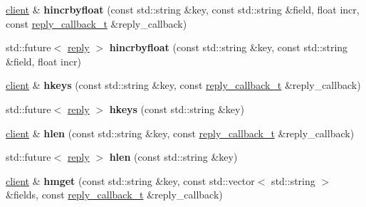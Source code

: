 \begin{DoxyCompactItemize}
\mbox{\hyperlink{classcpp__redis_1_1client}{client}} \& {\bfseries hincrbyfloat} (const std\+::string \&key, const std\+::string \&field, float incr, const \mbox{\hyperlink{classcpp__redis_1_1client_af7a65eb21aa25230bfbb0b0203c4fc04}{reply\+\_\+callback\+\_\+t}} \&reply\+\_\+callback)
\item 
\mbox{\label{classcpp__redis_1_1client_a6b856272a5956b3b2839c5b5749c9b97}} 
std\+::future$<$ \mbox{\hyperlink{classcpp__redis_1_1reply}{reply}} $>$ {\bfseries hincrbyfloat} (const std\+::string \&key, const std\+::string \&field, float incr)
\item 
\mbox{\label{classcpp__redis_1_1client_a432f322ff1818fa65208725b1be7f4d2}} 
\mbox{\hyperlink{classcpp__redis_1_1client}{client}} \& {\bfseries hkeys} (const std\+::string \&key, const \mbox{\hyperlink{classcpp__redis_1_1client_af7a65eb21aa25230bfbb0b0203c4fc04}{reply\+\_\+callback\+\_\+t}} \&reply\+\_\+callback)
\item 
\mbox{\label{classcpp__redis_1_1client_a578dade240f8fbbd6ba797bff9be18dd}} 
std\+::future$<$ \mbox{\hyperlink{classcpp__redis_1_1reply}{reply}} $>$ {\bfseries hkeys} (const std\+::string \&key)
\item 
\mbox{\label{classcpp__redis_1_1client_a88b88d74f77f2a59bc75b7d1fcdbd483}} 
\mbox{\hyperlink{classcpp__redis_1_1client}{client}} \& {\bfseries hlen} (const std\+::string \&key, const \mbox{\hyperlink{classcpp__redis_1_1client_af7a65eb21aa25230bfbb0b0203c4fc04}{reply\+\_\+callback\+\_\+t}} \&reply\+\_\+callback)
\item 
\mbox{\label{classcpp__redis_1_1client_a34b5783e7392f29dd26c6e114d535221}} 
std\+::future$<$ \mbox{\hyperlink{classcpp__redis_1_1reply}{reply}} $>$ {\bfseries hlen} (const std\+::string \&key)
\item 
\mbox{\label{classcpp__redis_1_1client_aac28715b6b151dd96ddb760fcc490c3c}} 
\mbox{\hyperlink{classcpp__redis_1_1client}{client}} \& {\bfseries hmget} (const std\+::string \&key, const std\+::vector$<$ std\+::string $>$ \&fields, const \mbox{\hyperlink{classcpp__redis_1_1client_af7a65eb21aa25230bfbb0b0203c4fc04}{reply\+\_\+callback\+\_\+t}} \&reply\+\_\+callback)

\end{DoxyCompactItemize}
